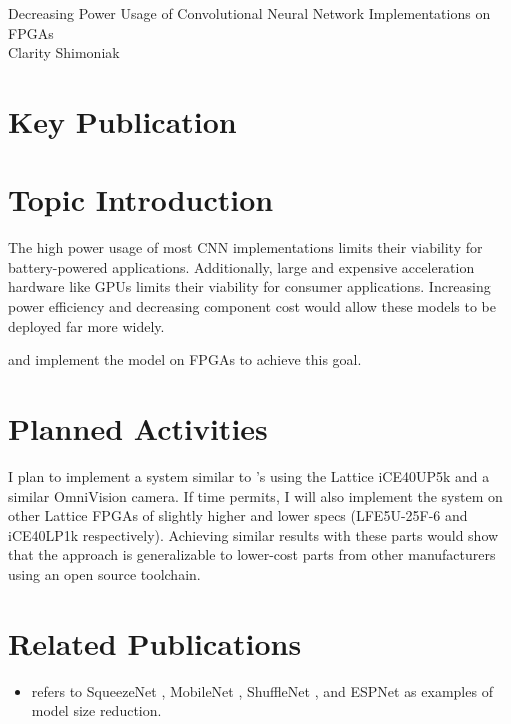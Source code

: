 \documentclass[12pt,letterpaper,english]{article}
\newcommand{\citework}[1]{\citeauthor{#1} \autocite{#1}}
\begin{document}
\begin{center}
	{\LARGE%
		Decreasing Power Usage of
		Convolutional Neural Network Implementations
		on FPGAs
	} \\
	\vspace{6pt}
	Clarity Shimoniak
	\vspace{-18pt}
\end{center}

\section*{Key Publication}



\section*{Topic Introduction}

The high power usage of most CNN implementations limits their viability for
battery-powered applications. Additionally, large and expensive acceleration
hardware like GPUs limits their viability for consumer applications. Increasing
power efficiency and decreasing component cost would allow these models to be
deployed far more widely.

\citework{mobilenet2019fpga} and \citework{mobilenet2021fpga} implement the
\citework{mobilenetv1} model on FPGAs to achieve this goal.


\section*{Planned Activities}

I plan to implement a system similar to \citeauthor*{old}'s using the Lattice
iCE40UP5k and a similar OmniVision camera. If time permits, I will also
implement the system on other Lattice FPGAs of slightly higher and lower specs
(LFE5U-25F-6 and iCE40LP1k respectively). Achieving similar results with these
parts would show that the approach is generalizable to lower-cost parts from
other manufacturers using an open source toolchain.


\section*{Related Publications}


\begin{itemize}
	\item \citeauthor{old} refers to
	SqueezeNet \autocite{squeezenet},
	MobileNet \autocites{mobilenetv1}{mobilenetv2},
	ShuffleNet \autocite{shufflenetv1}, and
	ESPNet \autocite{espnet}
	as examples of model size reduction.
\end{itemize}


\newpage
\printbibliography
\end{document}
